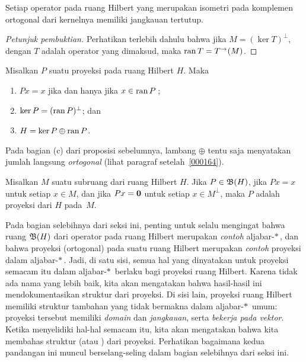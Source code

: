 \begin{prop} Setiap operator pada ruang Hilbert yang merupakan isometri pada komplemen ortogonal dari kernelnya memiliki jangkauan tertutup.
\end{prop}

\begin{proof}[\emph{Petunjuk pembuktian}] Perhatikan terlebih dahulu bahwa jika $M = (\ker T)^\perp$, dengan $T$ adalah operator yang dimaksud, maka
$\operatorname{ran} T = T^{\rightarrow}(M)$.    \ns
\end{proof}

\begin{prop} Misalkan $P$ suatu proyeksi pada ruang Hilbert $H$. Maka
 \begin{enumerate}[label=\rm{(\alph*)}]
  \item $Px = x$ jika dan hanya jika $x \in \operatorname{ran} P$\,;
  \item $\ker P = (\operatorname{ran} P)^\perp$; dan
  \item $H = \ker P \oplus \operatorname{ran} P$.
 \end{enumerate}
\end{prop}

Pada bagian (c) dari proposisi sebelumnya, lambang $\oplus$ tentu saja menyatakan
jumlah langsung \emph{ortogonal} (lihat paragraf setelah~\ref{000164}).

\begin{prop} Misalkan $M$ suatu subruang dari ruang Hilbert $H$.  Jika $P \in \mathfrak{B}(H)$, jika $Px = x$
untuk setiap $x \in M$, dan jika $Px = \mathbf{0}$ untuk setiap $x \in M^\perp$, maka $P$ adalah
proyeksi dari $H$ pada~$M$.
\end{prop}

Pada bagian selebihnya dari seksi ini, penting untuk selalu mengingat bahwa ruang $\mathfrak{B}(H)$ dari operator pada ruang
Hilbert merupakan \emph{contoh} aljabar-$*\,$, dan bahwa proyeksi (ortogonal) pada suatu ruang Hilbert merupakan
\emph{contoh} proyeksi dalam aljabar-$*\,$.  Jadi, di satu sisi, semua hal yang dinyatakan untuk
proyeksi semacam itu dalam aljabar-$*\,$ berlaku bagi proyeksi ruang Hilbert. Karena tidak ada nama yang lebih baik, kita akan mengatakan bahwa
hasil-hasil ini mendokumentasikan struktur
 dari proyeksi.  Di sisi lain, proyeksi ruang Hilbert memiliki struktur tambahan yang
tidak bermakna dalam aljabar-$*\,$ umum: proyeksi tersebut memiliki \emph{domain} dan \emph{jangkauan}, serta \emph{bekerja pada vektor}.
Ketika menyelidiki hal-hal semacam itu, kita akan mengatakan bahwa kita membahas struktur
 (atau ) dari proyeksi.  Perhatikan bagaimana kedua pandangan ini muncul berselang-seling dalam bagian selebihnya dari seksi ini.

